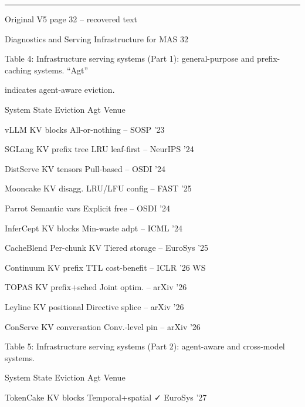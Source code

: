 \par\smallskip\noindent\rule{\textwidth}{0.4pt}\par{\sffamily\footnotesize Original V5 page 32 -- recovered text}\par\begin{flushleft}\footnotesize\ttfamily
\par\smallskip
\par\smallskip
\noindent Diagnostics and Serving Infrastructure for MAS 32\par
\par\smallskip
\par\smallskip
\noindent Table 4: Infrastructure serving systems (Part 1): general-purpose and prefix-caching systems. “Agt”\par
\noindent indicates agent-aware eviction.\par
\par\smallskip
\noindent  System State Eviction Agt Venue\par
\noindent  vLLM KV blocks All-or-nothing – SOSP ’23\par
\noindent  SGLang KV prefix tree LRU leaf-first – NeurIPS ’24\par
\noindent  DistServe KV tensors Pull-based – OSDI ’24\par
\noindent  Mooncake KV disagg. LRU/LFU config – FAST ’25\par
\noindent  Parrot Semantic vars Explicit free – OSDI ’24\par
\noindent  InferCept KV blocks Min-waste adpt – ICML ’24\par
\noindent  CacheBlend Per-chunk KV Tiered storage – EuroSys ’25\par
\noindent  Continuum KV prefix TTL cost-benefit – ICLR ’26 WS\par
\noindent  TOPAS KV prefix+sched Joint optim. – arXiv ’26\par
\noindent  Leyline KV positional Directive splice – arXiv ’26\par
\noindent  ConServe KV conversation Conv.-level pin – arXiv ’26\par
\par\smallskip
\noindent  Table 5: Infrastructure serving systems (Part 2): agent-aware and cross-model systems.\par
\par\smallskip
\noindent  System State Eviction Agt Venue\par
\noindent  TokenCake KV blocks Temporal+spatial ✓ EuroSys ’27\par

\end{flushleft}
